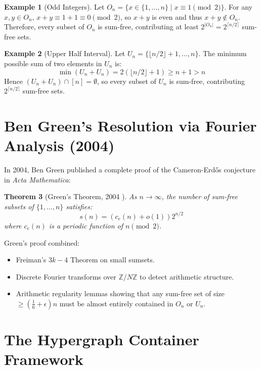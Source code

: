 \documentclass[11pt,a4paper]{article}
\newtheorem{theorem}{Theorem}[section]
\theoremstyle{definition}
\newtheorem{example}[theorem]{Example}
\begin{document}
\begin{example}[Odd Integers]\label{ex:odd_sum_free}
Let $O_n = \{ x \in \{1, \dots, n\} \mid x \equiv 1 \pmod 2 \}$.
For any $x, y \in O_n$, $x + y \equiv 1 + 1 \equiv 0 \pmod 2$, so $x + y$ is even and thus $x + y \notin O_n$.
Therefore, every subset of $O_n$ is sum-free, contributing at least $2^{|O_n|} = 2^{\lceil n/2 \rceil}$ sum-free sets.
\end{example}

\begin{example}[Upper Half Interval]\label{ex:upper_half}
Let $U_n = \{ \lfloor n/2 \rfloor + 1, \dots, n \}$.
The minimum possible sum of two elements in $U_n$ is:
\[ \min(U_n + U_n) = 2(\lfloor n/2 \rfloor + 1) \ge n + 1 > n \]
Hence $(U_n + U_n) \cap [n] = \emptyset$, so every subset of $U_n$ is sum-free, contributing $2^{\lceil n/2 \rceil}$ sum-free sets.
\end{example}

\section{Ben Green's Resolution via Fourier Analysis (2004)}

In 2004, Ben Green \cite{green2004cameron} published a complete proof of the Cameron-Erd\H{o}s conjecture in \emph{Acta Mathematica}:

\begin{theorem}[Green's Theorem, 2004 \cite{green2004cameron}]\label{thm:green_main}
As $n \to \infty$, the number of sum-free subsets of $\{1, \dots, n\}$ satisfies:
\begin{equation}\label{eq:green_asymptotics}
s(n) = \left( c_e(n) + o(1) \right) 2^{n/2}
\end{equation}
where $c_e(n)$ is a periodic function of $n \pmod 2$.
\end{theorem}

Green's proof combined:
\begin{itemize}
    \item Freiman's $3k - 4$ Theorem on small sumsets.
    \item Discrete Fourier transforms over $\mathbb{Z}/N\mathbb{Z}$ to detect arithmetic structure.
    \item Arithmetic regularity lemmas showing that any sum-free set of size $\ge (\frac{1}{6} + \epsilon)n$ must be almost entirely contained in $O_n$ or $U_n$.
\end{itemize}

\section{The Hypergraph Container Framework}
\end{document}
